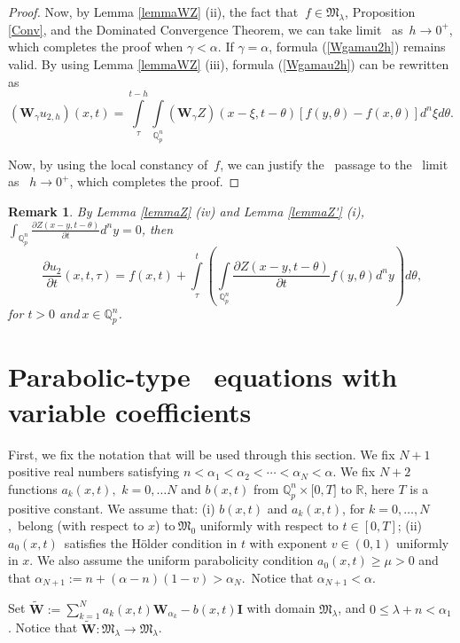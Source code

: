 \documentclass{amsart}\usepackage{amsfonts}
\theoremstyle{plain}
\newtheorem{remark}[theorem]{Remark}
\numberwithin{equation}{section}
\begin{document}
\begin{proof}
Now, by Lemma \ref{lemmaWZ} (ii), the fact that $\ f\in\mathcal{\mathfrak{M}}_{\lambda}$, Proposition \ref{Conv}, and the Dominated Convergence Theorem,
we can take limit \ as\ $h\rightarrow0^{+}$, which completes the proof when
$\gamma<\alpha.$ If $\gamma=\alpha$, formula (\ref{Wgamau2h}) remains valid.
By using Lemma \ref{lemmaWZ} (iii), formula (\ref{Wgamau2h}) can be rewritten
as\[
(\boldsymbol{W}_{\gamma}u_{2,h})(x,t)={\displaystyle\int\limits_{\tau}^{t-h}}
\underset{\mathbb{Q}_{p}^{n}}{\int}(\boldsymbol{W}_{\gamma}Z)(x-\xi
,t-\theta)\left[  f(y,\theta)-f(x,\theta)\right]  d^{n}\xi d\theta.
\]


Now, by using the local constancy of\ $f$, we can justify the \ passage to the
\ limit as \ $h\rightarrow0^{+}$, which completes the proof.
\end{proof}

\begin{remark}
By Lemma \ref{lemmaZ} (iv) and Lemma \ref{lemmaZ'} (i), $\int_{\mathbb{Q}_{p}^{n}}\frac{\partial Z(x-y,t-\theta)}{\partial t}d^{n}y=0$, then
\[
\frac{\partial u_{2}}{\partial t}(x,t,\tau)=f(x,t)+{\displaystyle\int\limits_{\tau}^{t}}
\left(  \underset{\mathbb{Q}_{p}^{n}}{\int}\frac{\partial Z(x-y,t-\theta
)}{\partial t}f(y,\theta)d^{n}y\right)  d\theta\text{,}\]
for $t>0$ and$\ x\in\mathbb{Q}_{p}^{n}$.
\end{remark}

\section{\label{Sect4}Parabolic-type \ equations with variable coefficients}

First, we fix the notation that will be used through this section. We fix
$N+1$ positive real numbers satisfying $n<\alpha_{1}<\alpha_{2}<\cdots
<\alpha_{N}<\alpha$. We fix $N+2$ functions $a_{k}(x,t),$ $k=0,\ldots N$ and
$b(x,t)$ from $\mathbb{Q}_{p}^{n}\times\lbrack0,T]$ to $\mathbb{R}$, here $T$
is a positive constant. We assume that: (i) $b(x,t)$ and $a_{k}(x,t)$, for
$k=0,\ldots,N$,\ belong (with respect to $x$) to$\ \mathcal{\mathfrak{M}}_{0}$
uniformly with respect to $t\in\left[  0,T\right]  $; (ii) $a_{0}(x,t)$\ satisfies the Hölder condition in $t$ with exponent $v\in(0,1)$
uniformly in $x$. We also assume the uniform parabolicity condition
$a_{0}(x,t)\geq\mu>0$ and that $\alpha_{N+1}:=n+\left(  \alpha-n\right)
(1-v)>\alpha_{N}$.\ Notice that $\alpha_{N+1}<\alpha$.

Set $\widetilde{\boldsymbol{W}}:=\sum_{k=1}^{N}a_{k}(x,t)\boldsymbol{\mathbf{W}}_{\alpha_{k}}-b(x,t)\boldsymbol{I}$ with domain
$\mathcal{\mathfrak{M}}_{\lambda}$, and $0\leq\lambda+n<\alpha_{1}$. Notice
that $\widetilde{\boldsymbol{W}}:\mathcal{\mathfrak{M}}_{\lambda}\rightarrow\mathcal{\mathfrak{M}}_{\lambda}$.
\end{document}
